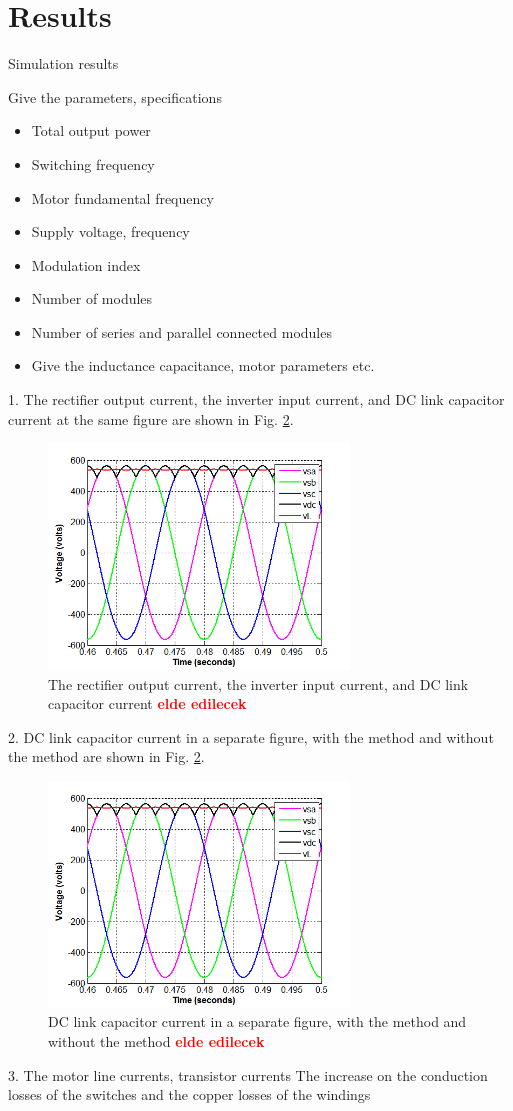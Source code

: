 \documentclass[conference,a4paper,twocolumn]{IEEEtran}
\begin{document}
\section{Results}
Simulation results

Give the parameters, specifications
\begin{itemize}
  \item Total output power
  \item Switching frequency
  \item Motor fundamental frequency
  \item Supply voltage, frequency
  \item Modulation index
  \item Number of modules
  \item Number of series and parallel connected modules
  \item Give the inductance capacitance, motor parameters etc.
\end{itemize}

1. The rectifier output current, the inverter input current, and DC link capacitor current at the same figure are shown in Fig. \ref{fig:sample}.
\begin{figure}[htp]
  \centering
  \includegraphics[width=8cm]{images/sample}
  \caption{The rectifier output current, the inverter input current, and DC link capacitor current  \textbf{\textcolor{red}{elde edilecek}}}
  \label{fig:sample}
\end{figure}
2. DC link capacitor current in a separate figure, with the method and without the method are shown in Fig. \ref{fig:sample}.
\begin{figure}[htp]
  \centering
  \includegraphics[width=8cm]{images/sample}
  \caption{DC link capacitor current in a separate figure, with the method and without the method  \textbf{\textcolor{red}{elde edilecek}}}
  \label{fig:sample}
\end{figure}
3. The motor line currents, transistor currents
The increase on the conduction losses of the switches and the copper losses of the windings
\end{document}
